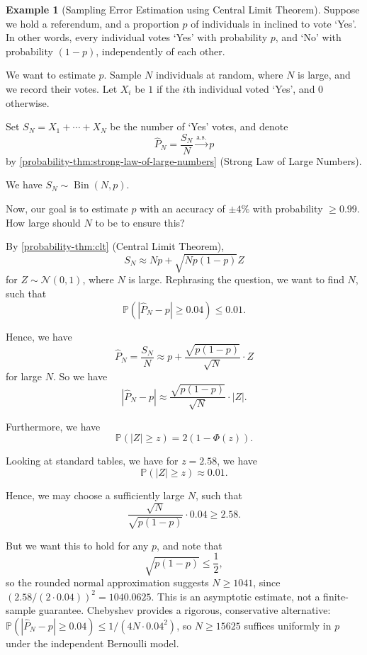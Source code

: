 \documentclass[11pt]{article}
\numberwithin{equation}{section}
\theoremstyle{definition}
\newtheorem{example}[theorem]{Example}
\theoremstyle{remark}
\newcommand{\pqty}[1]{\left(#1\right)}
\newcommand{\abs}[1]{\left|#1\right|}
\newcommand{\Prob}{\mathbb P}
\newcommand{\sNormCdf}{\Phi}
\newcommand{\toAlmostSure}{\xrightarrow{\mathrm{a.s.}}}
\newcommand{\Binomial}{\operatorname{Bin}}
\newcommand{\Normal}{\mathcal N}
\begin{document}
\begin{example}[Sampling Error Estimation using Central Limit Theorem]\label{probability-example-045}
    Suppose we hold a referendum, and a proportion \(p\) of individuals in inclined to vote `Yes'. In other words, every individual votes `Yes' with probability \(p\), and `No' with probability \(\pqty{1 - p}\), independently of each other.

    We want to estimate \(p\). Sample \(N\) individuals at random, where \(N\) is large, and we record their votes. Let \(X_i\) be \(1\) if the \(i\)th individual voted `Yes', and \(0\) otherwise.

    Set \(S_N = X_1 + \cdots + X_N\) be the number of `Yes' votes, and denote
    \[
        \hat{P}_N = \frac{S_N}{N} \toAlmostSure p
    \]
    by \autoref{probability-thm:strong-law-of-large-numbers} (Strong Law of Large Numbers).
    
    We have \(S_N \sim \Binomial\pqty{N, p}\).
    
    Now, our goal is to estimate \(p\) with an accuracy of \(\pm 4\%\) with probability \(\geq 0.99\). How large should \(N\) to be to ensure this?

    By \autoref{probability-thm:clt} (Central Limit Theorem),
    \[
        S_N \approx Np + \sqrt{N p \pqty{1 - p}} Z
    \]
    for \(Z \sim \Normal\pqty{0, 1}\), where \(N\) is large. Rephrasing the question, we want to find \(N\), such that
    \[
        \Prob\pqty{\abs{\hat{P}_N - p} \geq 0.04} \leq 0.01.
    \]

    Hence, we have
    \[
        \hat{P}_N = \frac{S_N}{N} \approx p + \frac{\sqrt{p \pqty{1 - p}}}{\sqrt{N}} \cdot Z
    \]  
    for large \(N\). So we have
    \[
        \abs{\hat{P}_N - p} \approx \frac{\sqrt{p \pqty{1 - p}}}{\sqrt{N}} \cdot \abs{Z}.
    \]

    Furthermore, we have
    \[
        \Prob\pqty{\abs{Z} \geq z} = 2 \pqty{1 - \sNormCdf\pqty{z}}.
    \]

    Looking at standard tables, we have for \(z = 2.58\), we have
    \[
        \Prob\pqty{\abs{Z} \geq z} \approx 0.01.
    \]

    Hence, we may choose a sufficiently large \(N\), such that
    \[
        \frac{\sqrt{N}}{\sqrt{p \pqty{1 - p}}} \cdot 0.04 \geq 2.58.
    \]

    But we want this to hold for any \(p\), and note that
    \[
        \sqrt{p \pqty{1 - p}} \leq \frac{1}{2},
    \]
    so the rounded normal approximation suggests \(N\ge1041\), since
\((2.58/(2\cdot0.04))^2=1040.0625\). This is an asymptotic estimate,
not a finite-sample guarantee. Chebyshev provides a rigorous, conservative
alternative: \(\Prob(|\hat P_N-p|\ge0.04)\le1/(4N\cdot0.04^2)\),
so \(N\ge15625\) suffices uniformly in \(p\) under the independent Bernoulli model.
\end{example}
\end{document}
